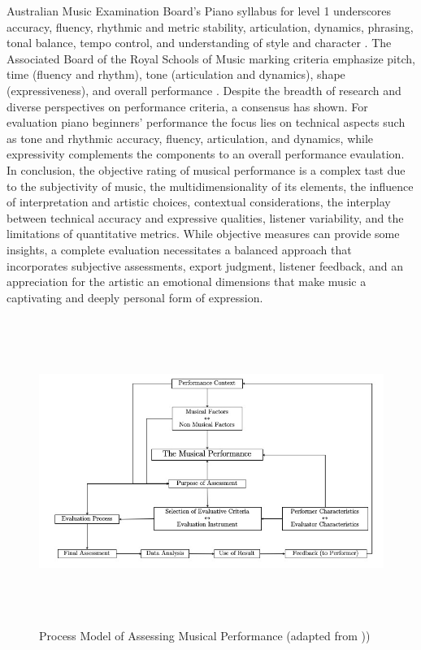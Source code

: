 Australian Music Examination Board's Piano syllabus for level 1 underscores accuracy, fluency, rhythmic and metric stability, articulation, dynamics, phrasing, tonal balance, tempo control, and understanding of style and character \cite{AMEB}. The Associated Board of the Royal Schools of Music marking criteria emphasize pitch, time (fluency and rhythm), tone (articulation and dynamics), shape (expressiveness), and overall performance \cite{ABRSM}. Despite the breadth of research and diverse perspectives on performance criteria, a consensus has shown. For evaluation piano beginners' performance the focus lies on technical aspects such as tone and rhythmic accuracy, fluency, articulation, and dynamics, while expressivity complements the components to an overall performance evaulation. \\
In conclusion, the objective rating of musical performance is a complex tast due to the subjectivity of music, the multidimensionality of its elements, the influence of interpretation and artistic choices, contextual considerations, the interplay between technical accuracy and expressive qualities, listener variability, and the limitations of quantitative metrics. While objective measures can provide some insights, a complete evaluation necessitates a balanced approach that incorporates subjective assessments, export judgment, listener feedback, and an appreciation for the artistic an emotional dimensions that make music a captivating and deeply personal form of expression.

\begin{figure}[]
	\centering
	\includegraphics[width=15cm,height=10cm,keepaspectratio]{Assessing}
	\caption{Process Model of Assessing Musical Performance (adapted from \cite{McPhearson1998}))}
	\label{fig:assess}
\end{figure}
